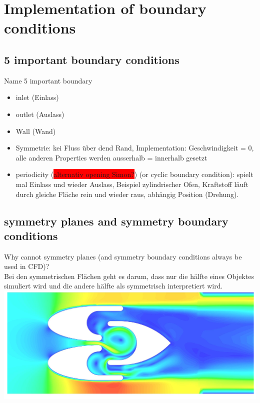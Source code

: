 \documentclass[a4paper]{scrartcl}
\begin{document}
\section{Implementation of boundary conditions}

\subsection{5 important boundary conditions}
Name 5 important boundary\\

\begin{itemize}
  \item inlet (Einlass)
  \item outlet (Auslass)
  \item Wall (Wand)
  \item Symmetrie: kei Fluss über dend Rand, Implementation: Geschwindigkeit =
  0, alle anderen Properties werden ausserhalb = innerhalb gesetzt
  \item periodicity (\colorbox{red}{alternativ opening Simon?}) (or cyclic
  boundary condition): spielt mal Einlass und wieder Auslass, Beispiel zylindrischer
  Ofen, Kraftstoff läuft durch gleiche Fläche rein und wieder raus, abhängig
  Position (Drehung).
\end{itemize}


\subsection{symmetry planes and symmetry boundary conditions}
Why cannot symmetry planes (and symmetry boundary conditions always
be used in CFD)?\\
Bei den symmetrischen Flächen geht es darum, dass nur die hälfte eines Objektes
simuliert wird und die andere hälfte als symmetrisch interpretiert wird.\\

\includegraphics[scale=0.6]{images/symmetrie.pdf}
\end{document}
